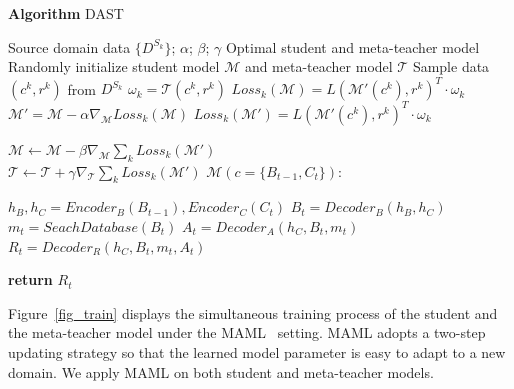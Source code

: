 \documentclass[letterpaper]{article} %
\begin{document}
\begin{algorithm}[t] %
\caption*{\textbf{Algorithm} DAST} %
\label{alg1} %
\begin{algorithmic} 
    \renewcommand{\algorithmicrequire}{\textbf{Input:}}
    \REQUIRE Source domain data $\{D^{S_k}\}$; $\alpha$; $\beta$; $\gamma$
    \renewcommand{\algorithmicensure}{\textbf{Output:}} 
    \ENSURE Optimal student and meta-teacher model
        \STATE Randomly initialize student model $\mathcal{M}$ and meta-teacher model $\mathcal{T}$
        \STATE Sample data $(c^k, {r}^k)$ from $D^{S_k}$
        \STATE $\omega_k = \mathcal{T}(c^k, {r}^k)$
        \STATE $Loss_k(\mathcal{M})={\mathit{L}(\mathcal{M'}(c^k),{r}^k)}^T\cdot \omega_k$
        \STATE $\mathcal{M}'=\mathcal{M}-\alpha \nabla_{\mathcal{M}}Loss_k(\mathcal{M})$
        \STATE $Loss_k(\mathcal{M'})={\mathit{L}(\mathcal{M'}(c^k),{r}^k)}^T\cdot \omega_k$
    \ENDFOR
    
    $\mathcal{M} \leftarrow \mathcal{M} - \beta \nabla_{\mathcal{M}} \sum_{k} Loss_k(\mathcal{M}')$\\
    $\mathcal{T} \leftarrow \mathcal{T} + \gamma \nabla_{\mathcal{T}} \sum_{k} Loss_k(\mathcal{M}')$
    \ENDWHILE
    \STATE 
    \renewcommand{\algorithmicrequire}{\textbf{Student Model}}
    \REQUIRE $\mathcal{M}(c=\{B_{t-1},C_t\}):$
  
        \STATE $h_B, h_C = Encoder_B(B_{t-1}), Encoder_C(C_t)$
        \STATE $B_t = Decoder_B(h_B, h_C)$
        \STATE $m_t = SeachDatabase(B_t)$
        \STATE $A_t = Decoder_A(h_C, B_t, m_t)$
        \STATE $R_t = Decoder_R(h_C,B_t,m_t, A_t)$

        \STATE \textbf{return} $R_t$  
\end{algorithmic}
\end{algorithm}

Figure~\ref{fig_train} displays the simultaneous training process of the student and the meta-teacher model under the MAML~\citep{finn2017model} setting. MAML adopts a two-step updating strategy so that the learned model parameter is easy to adapt to a new domain. We apply MAML on both student and meta-teacher models.
    
\end{document}
